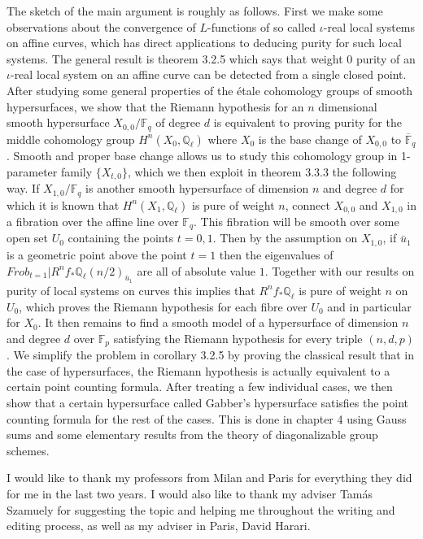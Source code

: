 \documentclass{ucbthesis}
\theoremstyle{definition}
\theoremstyle{theorem}
\begin{document}
The sketch of the main argument is roughly as follows. First we make some observations about the convergence of $L$-functions of so called $\iota$-real local systems on affine curves, which has direct applications to deducing purity for such local systems. The general result is theorem 3.2.5 which says that  weight $0$ purity of an $\iota$-real local system on an affine curve can be detected from a single closed point. After studying some general properties of the \'{e}tale cohomology groups of smooth hypersurfaces, we show that the Riemann hypothesis for an $n$ dimensional smooth hypersurface $X_{0,0}/\mathbb{F}_{q}$ of degree $d$ is equivalent to proving purity for the middle cohomology group $H^{n}(X_{0},\mathbb{Q}_{\ell})$ where $X_{0}$ is the base change of $X_{0,0}$ to $\overline{\mathbb{F}}_{q}$. Smooth and proper base change allows us to study this cohomology group in 1-parameter family $\{X_{t,0}\}$, which we then exploit in theorem 3.3.3 the following way. If $X_{1,0}/\mathbb{F}_{q}$ is another smooth hypersurface of dimension $n$ and degree $d$ for which it is known that $H^{n}(X_{1},\mathbb{Q}_{\ell})$ is pure of weight $n$, connect $X_{0,0}$ and $X_{1,0}$ in a fibration over the affine line over $\mathbb{F}_{q}$.  This fibration will be smooth over some open set $U_{0}$ containing the points $t=0,1$. Then by the assumption on $X_{1,0}$, if $\bar{u}_{1}$ is a geometric point above the point $t=1$ then the eigenvalues of $Frob_{t=1}|R^{n}f_{*}\mathbb{Q}_{\ell}(n/2)_{\bar{u}_{1}}$ are all of absolute value $1$. Together with our results on purity of local systems on curves this implies that $R^{n}f_{*}\mathbb{Q}_{\ell}$ is pure of weight $n$ on $U_{0}$, which proves the Riemann hypothesis for each fibre over $U_{0}$ and in particular for $X_{0}$. It then remains to find a smooth model of a hypersurface of dimension $n$ and degree $d$ over $\mathbb{F}_{p}$  satisfying the Riemann hypothesis for every triple $(n,d,p)$. We simplify the problem in corollary 3.2.5 by proving the classical result that in the case of hypersurfaces, the Riemann hypothesis is actually equivalent to a certain point counting formula. After treating a few individual cases, we then show that a certain hypersurface called Gabber's hypersurface satisfies the point counting formula for the rest of the cases. This is done in chapter 4 using Gauss sums and some elementary results from the theory of diagonalizable group schemes. 


I would like to thank my professors from Milan and Paris for everything they did for me in the last two years. I would also like to thank my adviser Tam\'{a}s Szamuely for suggesting the topic and helping me throughout the writing and editing process, as well as my adviser in Paris, David Harari.
\end{document}
